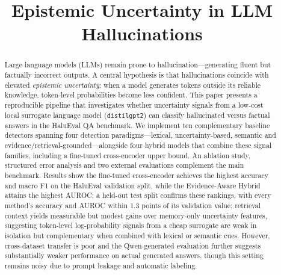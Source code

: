 \documentclass[conference]{IEEEtran}
\begin{document}

\title{Epistemic Uncertainty in LLM Hallucinations}

\author{
}

\maketitle
\sloppy

\begin{abstract}
Large language models (LLMs) remain prone to hallucination—generating fluent but factually incorrect outputs. A central hypothesis is that hallucinations coincide with elevated \emph{epistemic uncertainty}: when a model generates tokens outside its reliable knowledge, token-level probabilities become less confident. This paper presents a reproducible pipeline that investigates whether uncertainty signals from a low-cost local surrogate language model (\texttt{distilgpt2}) can classify hallucinated versus factual answers in the HaluEval QA benchmark. We implement ten complementary baseline detectors spanning four detection paradigms—lexical, uncertainty-based, semantic and evidence/retrieval-grounded—alongside four hybrid models that combine these signal families, including a fine-tuned cross-encoder upper bound. An ablation study, structured error analysis and two external evaluations complement the main benchmark. Results show the fine-tuned cross-encoder achieves the highest accuracy and macro F1 on the HaluEval validation split, while the Evidence-Aware Hybrid attains the highest AUROC; a held-out test split confirms these rankings, with every method's accuracy and AUROC within 1.3 points of its validation value; retrieval context yields measurable but modest gains over memory-only uncertainty features, suggesting token-level log-probability signals from a cheap surrogate are weak in isolation but complementary when combined with lexical or semantic cues. However, cross-dataset transfer is poor and the Qwen-generated evaluation further suggests substantially weaker performance on actual generated answers, though this setting remains noisy due to prompt leakage and automatic labeling.
\end{abstract}
\end{document}
